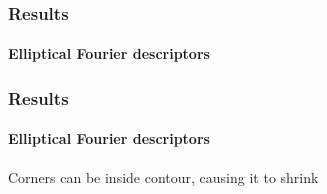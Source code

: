 \begin{frame}[plain]
\frametitle{Results}
\framesubtitle{Elliptical Fourier descriptors}
\mypagenum
	\begin{changemargin}{-1.3in}{0in}
	\end{changemargin}
\end{frame}





\begin{frame}
\frametitle{Results}
\framesubtitle{Elliptical Fourier descriptors}
\logoCSIPCPL\mypagenum
	Corners can be inside contour, causing it to shrink
	\begin{columns}
		\begin{column}{1in}


\end{column}
\end{columns}
\end{frame}
